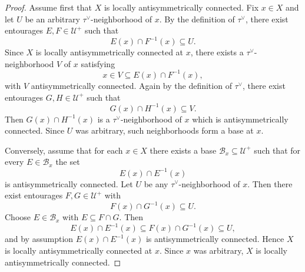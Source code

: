 \documentclass[10pt,a4paper]{amsart}
\begin{document}
\begin{proof}
Assume first that $X$ is locally antisymmetrically connected.
Fix $x\in X$ and let $U$ be an arbitrary $\tau^\vee$-neighborhood of $x$.
By the definition of $\tau^\vee$, there exist entourages
$E,F\in\mathcal U^{+}$ such that
\[
E(x)\cap F^{-1}(x)\subseteq U.
\]
Since $X$ is locally antisymmetrically connected at $x$, there exists a
$\tau^\vee$-neighborhood $V$ of $x$ satisfying
\[
x\in V\subseteq E(x)\cap F^{-1}(x),
\]
with $V$ antisymmetrically connected.
Again by the definition of $\tau^\vee$, there exist entourages
$G,H\in\mathcal U^{+}$ such that
\[
G(x)\cap H^{-1}(x)\subseteq V.
\]
Then $G(x)\cap H^{-1}(x)$ is a $\tau^\vee$-neighborhood of $x$ which is
antisymmetrically connected. Since $U$ was arbitrary, such neighborhoods
form a base at $x$.

Conversely, assume that for each $x\in X$ there exists a base
$\mathcal B_x\subseteq\mathcal U^{+}$ such that for every
$E\in\mathcal B_x$ the set
\[
E(x)\cap E^{-1}(x)
\]
is antisymmetrically connected.
Let $U$ be any $\tau^\vee$-neighborhood of $x$.
Then there exist entourages $F,G\in\mathcal U^{+}$ with
\[
F(x)\cap G^{-1}(x)\subseteq U.
\]
Choose $E\in\mathcal B_x$ with $E\subseteq F\cap G$.
Then
\[
E(x)\cap E^{-1}(x)\subseteq F(x)\cap G^{-1}(x)\subseteq U,
\]
and by assumption $E(x)\cap E^{-1}(x)$ is antisymmetrically connected.
Hence $X$ is locally antisymmetrically connected at $x$.
Since $x$ was arbitrary, $X$ is locally antisymmetrically connected.
\end{proof}
\end{document}
